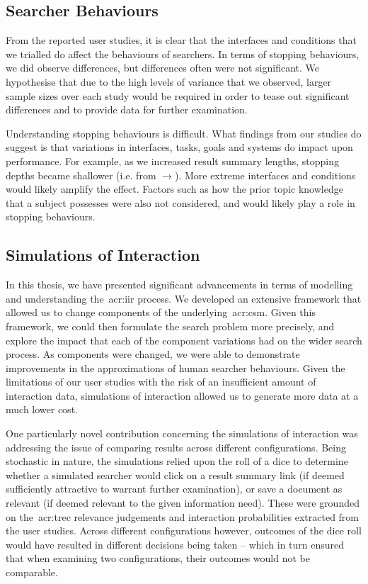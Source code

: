 \subsection{Searcher Behaviours}\label{sec:conclusions:discussion:behaviours}
From the reported user studies, it is clear that the interfaces and conditions that we trialled do affect the behaviours of searchers. In terms of stopping behaviours, we did observe differences, but differences often were not significant. We hypothesise that due to the high levels of variance that we observed, larger sample sizes over each study would be required in order to tease out significant differences and to provide data for further examination.

Understanding stopping behaviours is difficult. What findings from our studies do suggest is that variations in interfaces, tasks, goals and systems do impact upon performance. For example, as we increased result summary lengths, stopping depths became shallower (i.e. from $\rightarrow$). More extreme interfaces and conditions would likely amplify the effect. Factors such as how the prior topic knowledge that a subject possesses were also not considered, and would likely play a role in stopping behaviours.

\subsection{Simulations of Interaction}\label{sec:conclusions:discussion:simulations}
In this thesis, we have presented significant advancements in terms of modelling and understanding the~\gls{acr:iir} process. We developed an extensive framework that allowed us to change components of the underlying~\gls{acr:csm}. Given this framework, we could then formulate the search problem more precisely, and explore the impact that each of the component variations had on the wider search process. As components were changed, we were able to demonstrate improvements in the approximations of human searcher behaviours. Given the limitations of our user studies with the risk of an insufficient amount of interaction data, simulations of interaction allowed us to generate more data at a much lower cost.

One particularly novel contribution concerning the simulations of interaction was addressing the issue of comparing results across different configurations. Being stochastic in nature, the simulations relied upon the roll of a dice to determine whether a simulated searcher would click on a result summary link (if deemed sufficiently attractive to warrant further examination), or save a document as relevant (if deemed relevant to the given information need). These were grounded on the~\gls{acr:trec} relevance judgements and interaction probabilities extracted from the user studies. Across different configurations however, outcomes of the dice roll would have resulted in different decisions being taken -- which in turn ensured that when examining two configurations, their outcomes would not be comparable.

